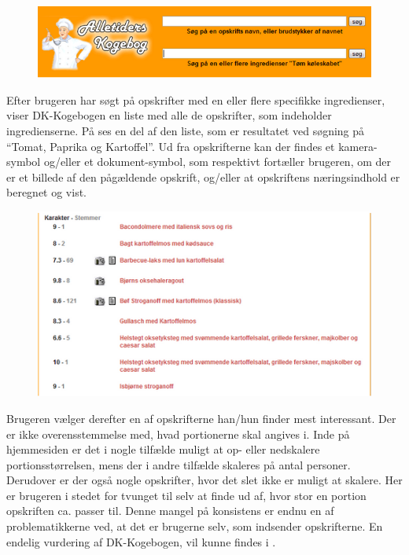 \begin{figure}[H]
\centering
\includegraphics[scale=0.7]{billeder/forbilleder/dk-kogebogen.png}
\label{fig:dk-kogebogen1}
\end{figure}

Efter brugeren har søgt på opskrifter med en eller flere specifikke ingredienser, viser DK-Kogebogen en liste med alle de opskrifter, som indeholder ingredienserne. På  ses en del af den liste, som er resultatet ved søgning på ``Tomat, Paprika og Kartoffel''. Ud fra opskrifterne kan der findes et kamera-symbol og/eller et dokument-symbol, som respektivt fortæller brugeren, om der er et billede af den pågældende opskrift, og/eller at opskriftens næringsindhold er beregnet og vist.


\begin{figure}[H]
\centering
\includegraphics[scale=0.7]{billeder/forbilleder/dk-kogebogen2.png}
\label{fig:dk-kogebogen2}
\end{figure}

Brugeren vælger derefter en af opskrifterne han/hun finder mest interessant. Der er ikke overensstemmelse med, hvad \fx portionerne skal angives i. Inde på hjemmesiden er det i nogle tilfælde muligt at op- eller nedskalere portionsstørrelsen, mens der i andre tilfælde skaleres på antal personer. Derudover er der også nogle opskrifter, hvor det slet ikke er muligt at skalere. Her er brugeren i stedet for tvunget til selv at finde ud af, hvor stor en portion opskriften ca. passer til. Denne mangel på konsistens er endnu en af problematikkerne ved, at det er brugerne selv, som indsender opskrifterne. En endelig vurdering af DK-Kogebogen, vil kunne findes i .
